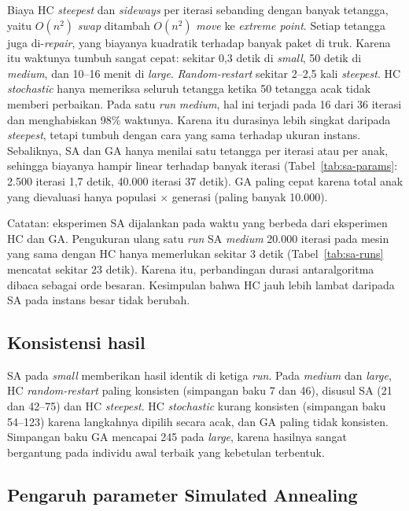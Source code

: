 Biaya HC \textit{steepest} dan \textit{sideways} per iterasi sebanding dengan banyak
tetangga, yaitu $O(n^2)$ \textit{swap} ditambah $O(n^2)$ \textit{move} ke \textit{extreme
point}. Setiap tetangga juga di-\textit{repair}, yang biayanya kuadratik terhadap banyak
paket di truk. Karena itu waktunya tumbuh sangat cepat: sekitar 0,3 detik di
\textit{small}, 50 detik di \textit{medium}, dan 10--16 menit di \textit{large}.
\textit{Random-restart} sekitar 2--2,5 kali \textit{steepest}. HC \textit{stochastic}
hanya memeriksa seluruh tetangga ketika 50 tetangga acak tidak memberi perbaikan.
Pada satu \textit{run} \textit{medium}, hal ini terjadi pada 16 dari 36 iterasi dan
menghabiskan 98\% waktunya. Karena itu durasinya lebih singkat daripada
\textit{steepest}, tetapi tumbuh dengan cara yang sama terhadap ukuran instans.
Sebaliknya, SA dan GA hanya
menilai satu tetangga per iterasi atau per anak, sehingga biayanya hampir linear
terhadap banyak iterasi (Tabel~\ref{tab:sa-params}: 2.500 iterasi 1,7 detik, 40.000
iterasi 37 detik). GA paling cepat karena total anak yang dievaluasi hanya
populasi $\times$ generasi (paling banyak 10.000).

Catatan: eksperimen SA dijalankan pada waktu yang berbeda dari eksperimen HC dan GA.
Pengukuran ulang satu \textit{run} SA \textit{medium} 20.000 iterasi pada mesin yang
sama dengan HC hanya memerlukan sekitar 3 detik (Tabel~\ref{tab:sa-runs} mencatat
sekitar 23 detik). Karena itu, perbandingan durasi antaralgoritma dibaca sebagai
orde besaran. Kesimpulan bahwa HC jauh lebih lambat daripada SA pada instans besar
tidak berubah.

\subsection{Konsistensi hasil}

SA pada \textit{small} memberikan hasil identik di ketiga \textit{run}. Pada
\textit{medium} dan \textit{large}, HC \textit{random-restart} paling konsisten
(simpangan baku 7 dan 46), disusul SA (21 dan 42--75) dan HC \textit{steepest}.
HC \textit{stochastic} kurang konsisten (simpangan baku 54--123) karena langkahnya
dipilih secara acak, dan GA paling tidak konsisten. Simpangan baku GA mencapai
245 pada \textit{large}, karena hasilnya sangat bergantung pada individu awal terbaik
yang kebetulan terbentuk.

\subsection{Pengaruh parameter Simulated Annealing}

